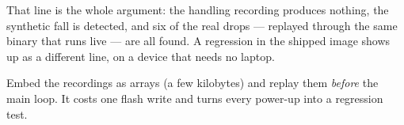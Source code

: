 That line is the whole argument: the handling recording produces nothing, the synthetic fall
is detected, and six of the real drops — replayed through the same binary that runs live — are
all found. A regression in the shipped image shows up as a different line, on a device that
needs no laptop.

\begin{tipbox}
    Embed the recordings as  arrays (a few kilobytes) and replay them
    \emph{before} the main loop. It costs one flash write and turns every power-up into a
    regression test.
\end{tipbox}
